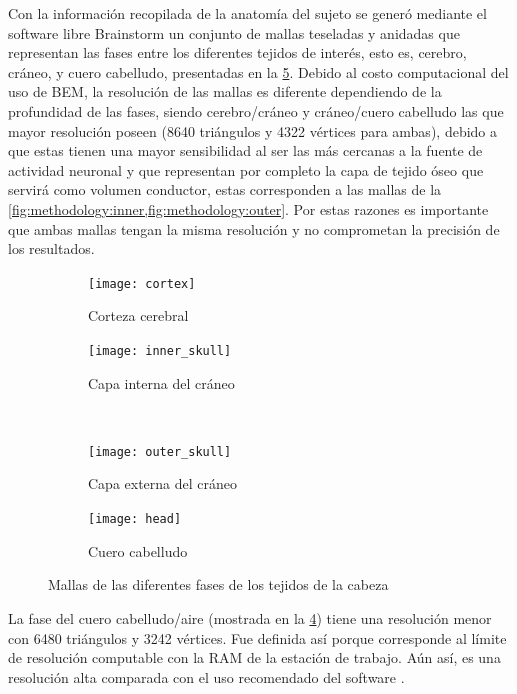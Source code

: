 Con la información recopilada de la anatomía del sujeto se generó mediante el software libre Brainstorm \cite{brain2011} un conjunto de mallas teseladas y anidadas que representan las fases entre los diferentes tejidos de interés, esto es, cerebro, cráneo, y cuero cabelludo, presentadas en la \cref{fig:methodology:meshes}.
Debido al costo computacional del uso de BEM, la resolución de las mallas es diferente dependiendo de la profundidad de las fases, siendo cerebro/cráneo y cráneo/cuero cabelludo las que mayor resolución poseen (8640 triángulos y 4322 vértices para ambas), debido a que estas tienen una mayor sensibilidad al ser las más cercanas a la fuente de actividad neuronal y que representan por completo la capa de tejido óseo que servirá como volumen conductor, estas corresponden a las mallas de la \cref{fig:methodology:inner,fig:methodology:outer}.
Por estas razones es importante que ambas mallas tengan la misma resolución y no comprometan la precisión de los resultados. 

\begin{figure}[tbp]
	\centering
	\begin{subfigure}{0.45\textwidth}
		\texttt{[image: cortex]}
		\caption{Corteza cerebral}
		\label{fig:methodology:cortex}
		\vspace{0.1cm}
	\end{subfigure}\hfill
	\begin{subfigure}{0.45\textwidth}
		\texttt{[image: inner\_skull]}
		\caption{Capa interna del cráneo}
		\label{fig:methodology:inner}
		\vspace{0.1cm}
	\end{subfigure}\\
	\begin{subfigure}{0.45\textwidth}
		\texttt{[image: outer\_skull]}
		\caption{Capa externa del cráneo}
		\label{fig:methodology:outer}
	\end{subfigure}\hfill
	\begin{subfigure}{0.45\textwidth}
		\texttt{[image: head]}
		\caption{Cuero cabelludo}
		\label{fig:methodology:head}
	\end{subfigure}
	\caption{Mallas de las diferentes fases de los tejidos de la cabeza}
	\label{fig:methodology:meshes}
\end{figure}

La fase del cuero cabelludo/aire (mostrada en la \cref{fig:methodology:head}) tiene una resolución menor con 6480 triángulos y 3242 vértices.
Fue definida así porque corresponde al límite de resolución computable con la RAM de la estación de trabajo.
Aún así, es una resolución alta comparada con el uso recomendado del software \cite{tadelMEGEEGGroup2019a}.

